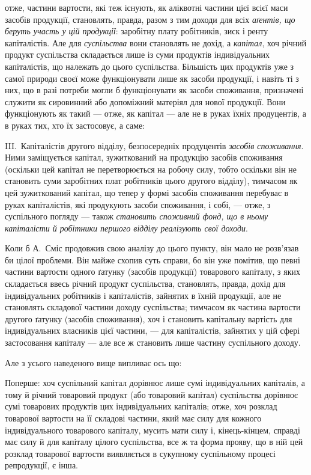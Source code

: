 \parcont{}  %
отже, частини вартости, які теж існують, як аліквотні частини цієї всієї
маси засобів продукції, становлять, правда, разом з тим доходи для
всіх \emph{аґентів, що беруть участь у цій продукції}: заробітну
плату робітників, зиск і ренту капіталістів. Але для \emph{суспільства}
вони становлять не дохід, а \emph{капітал}, хоч річний продукт суспільства
складається лише із суми продуктів індивідуальних капіталістів, що належать
до цього суспільства. Більшість цих продуктів уже з самої природи
своєї може функціонувати лише як засоби продукції, і навіть ті з них,
що в разі потреби могли б функціонувати як засоби споживання, призначені
служити як сировинний або допоміжний матеріял для нової продукції.
Вони функціонують як такий — отже, як капітал — але не в руках
їхніх продуцентів, а в руках тих, хто їх застосовує, а саме:

III.~Капіталістів другого відділу, безпосередніх продуцентів \emph{засобів
споживання}. Ними заміщується капітал, зужиткований на продукцію
засобів споживання (оскільки цей капітал не перетворюється на робочу
силу, тобто оскільки він не становить суми заробітних плат робітників
цього другого відділу), тимчасом як цей зужиткований капітал, що тепер
у формі засобів споживання перебуває в руках капіталістів, які продукують
засоби споживання, і собі, — отже, з суспільного погляду — також
\emph{становить споживний фонд, що в ньому капіталісти
й робітники першого відділу реалізують свої доходи}.

Коли б А.~Сміс продовжив свою аналізу до цього пункту, він мало
не роз\-в’я\-зав би цілої проблеми. Він майже схопив суть справи, бо він
уже помітив, що певні частини вартости одного ґатунку (засобів продукції)
товарового капіталу, з яких складається ввесь річний продукт
суспільства, становлять, правда, дохід для індивідуальних робітників і капіталістів,
зайнятих в їхній продукції, але не становлять складової частини
доходу суспільства; тимчасом як частина вартости другого ґатунку
(засобів споживання), хоч і становить капітальну вартість для індивідуальних
власників цієї частини, — для капіталістів, зайнятих у цій сфері
застосовання капіталу — але все ж становить лише частину суспільного
доходу.

Але з усього наведеного вище випливає ось що:

Поперше: хоч суспільний капітал дорівнює лише сумі індивідуальних
капіталів, а тому й річний товаровий продукт (або товаровий капітал)
суспільства дорівнює сумі товарових продуктів цих індивідуальних капіталів;
отже, хоч розклад товарової вартости на її складові частини, який має
силу для кожного індивідуального товарового капіталу, мусить мати силу
і, кінець-кінцем, справді має силу й для капіталу цілого суспільства, все ж
та форма прояву, що в ній цей розклад товарової вартости виявляється
в сукупному суспільному процесі репродукції, є інша.

